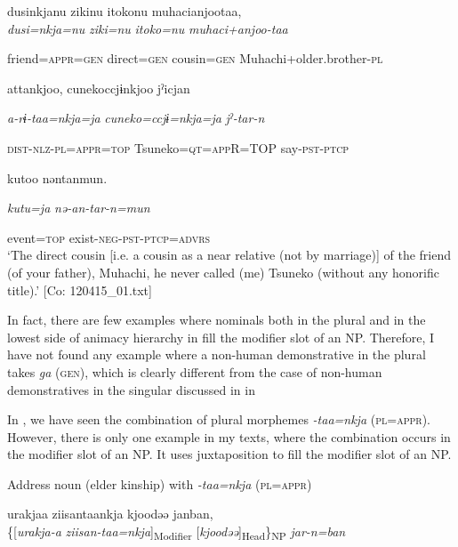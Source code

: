 \begin{table}
{\TM}
\glll dusinkjanu  zikinu  {\textbar}itoko{\textbar}nu  muhacianjootaa,\\

      \textit{dusi=nkja=nu}  \textit{ziki=nu}  \textit{itoko=nu}  \textit{muhaci+anjoo-taa}

      friend=\textsc{appr}=\textsc{gen}  direct=\textsc{gen}  cousin=\textsc{gen}  Muhachi+older.brother-\textsc{pl}

      attankjoo,  cunekoccjɨnkjoo  jˀicjan

      \textit{a-rɨ-taa=nkja=ja}  \textit{cuneko=ccjɨ=nkja=ja}  \textit{jˀ-tar-n}

      \textsc{dist}-\textsc{nlz}-\textsc{pl}=\textsc{appr}=\textsc{top}  Tsuneko=\textsc{qt}=\textsc{app}R=TOP  say-\textsc{pst}-\textsc{ptcp}

      kutoo  nəntanmun.

      \textit{kutu=ja}  \textit{nə-an-tar-n=mun}

      event=\textsc{top}  exist-\textsc{neg}-\textsc{pst}-\textsc{ptcp}=\textsc{advrs}\\
\glt ‘The direct cousin [i.e. a cousin as a near relative (not by marriage)] of the friend (of your father), Muhachi, he never called (me) Tsuneko (without any honorific title).’ [Co: 120415\_01.txt]
\z

In fact, there are few examples where nominals both in the plural and in the lowest side of animacy hierarchy in  fill the modifier slot of an NP. Therefore, I have not found any example where a non-human demonstrative in the plural takes \textit{ga} (\textsc{gen}), which is clearly different from the case of non-human demonstratives in the singular discussed in  in 

In , we have seen the combination of plural morphemes \textit{-taa=nkja} (\textsc{pl}=\textsc{appr}). However, there is only one example in my texts, where the combination occurs in the modifier slot of an NP. It uses juxtaposition to fill the modifier slot of an NP.

\ea\label{ex:6-114}
  Address noun (elder kinship) with \textit{-taa=nkja} (\textsc{pl}=\textsc{appr})

{\TM}
\glll urakjaa  ziisantaankja  kjoodəə  janban,\\

    \{[\textit{urakja-a}  \textit{ziisan-taa=nkja}]\textsubscript{Modifier}  [\textit{kjoodəə}]\textsubscript{Head}\}\textsubscript{NP}  \textit{jar-n=ban}


\end{table}
